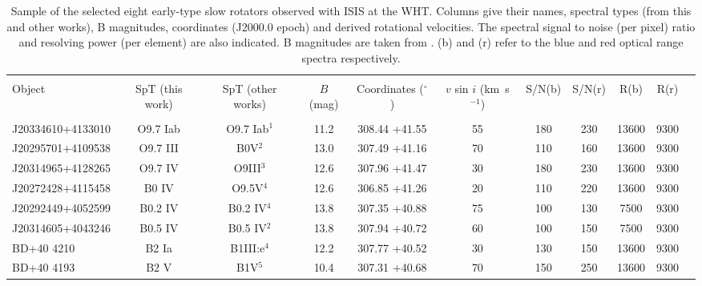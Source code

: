 \documentclass{aa} %
\begin{document}
 \begin{table*}[t!]
	\centering
	\caption{Sample of the selected eight early-type slow rotators observed with ISIS at the WHT. Columns give their names, spectral types (from this and other works), B magnitudes, coordinates (J2000.0 epoch) and derived rotational velocities. The spectral signal to noise (per pixel) ratio and  resolving power (per element) are also indicated. B magnitudes are taken from \cite{com12}. (b) and (r) refer to the blue and red optical range spectra respectively.}
	\label{table2}
		\begin{tabular}{lcccccccccc}
		\hline   
		\hline\\[-1.8ex]
    	\small{Object} & \small{SpT (this work)}&  \small{SpT (other works)}&\small{$B$ (mag)}&\small{Coordinates ($^{\circ}$)} &\small{$v$ sin $i$ (km~s$^{-1}$)}& \small{S/N(b)}& \small{S/N(r)}& \small{R(b)}& \small{R(r)}\\
    \hline	\\[-1.5ex]
\small{J20334610+4133010}  &\small{O9.7 Iab} &\small{O9.7 Iab$^{1}$}& \small{11.2}& \small{308.44 +41.55}& \small{55}& \small{180}& \small{230}& \small{13600}& \small{9300}\\    
\small{J20295701+4109538}  &  \small{O9.7 III} &\small{B0V$^{2}$}& \small{13.0}& \small{307.49 +41.16}& \small{70}& \small{110}& \small{160}& \small{13600}& \small{9300}\\ 
\small{J20314965+4128265}  &\small{O9.7 IV}&\small{O9III$^{3}$} & \small{12.6}& \small{307.96 +41.47}& \small{30}& \small{180}& \small{230}& \small{13600}& \small{9300}\\       
\small{J20272428+4115458}  &\small{B0 IV} &\small{O9.5V$^{4}$}& \small{12.6}& \small{306.85 +41.26}& \small{20}& \small{110}& \small{220}& \small{13600}& \small{9300}\\
\small{J20292449+4052599}  & \small{B0.2 IV} &\small{B0.2 IV$^{4}$}& \small{13.8}& \small{307.35 +40.88}& \small{75}& \small{100}& \small{130}& \small{7500}& \small{9300}\\
\small{J20314605+4043246}  & \small{B0.5 IV} &\small{B0.5 IV$^{2}$}& \small{13.8}& \small{307.94 +40.72}& \small{60}& \small{100}& \small{150}& \small{7500} & \small{9300}\\
\small{BD+40 4210}  &  \small{B2 Ia} &\small{B1III:e$^{4}$}& \small{12.2}& \small{307.77 +40.52}& \small{30}& \small{130}& \small{150}& \small{13600}& \small{9300} \\
\small{BD+40 4193}  &  \small{B2 V}&\small{B1V$^{5}$} & \small{10.4}& \small{307.31 +40.68} & \small{70}& \small{150}& \small{250}& \small{13600}& \small{9300}\\ 
\hline
		\end{tabular}
\end{table*}
\end{document}
